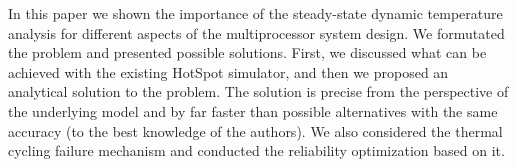 In this paper we shown the importance of the steady-state dynamic temperature analysis for different aspects of the multiprocessor system design. We formutated the problem and presented possible solutions. First, we discussed what can be achieved with the existing HotSpot simulator, and then we proposed an analytical solution to the problem. The solution is precise from the perspective of the underlying model and by far faster than possible alternatives with the same accuracy (to the best knowledge of the authors). We also considered the thermal cycling failure mechanism and conducted the reliability optimization based on it.

